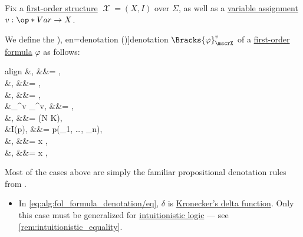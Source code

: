 \begin{algorithm}\label{alg:fol_formula_denotation}\mimprovised
  Fix a \hyperref[def:fol_structure]{first-order structure} \( \mscrX = (X, I) \) over \( \Sigma \), as well as a \hyperref[def:fol_variable_assignment]{variable assignment} \( v: \op*{Var} \to X \).

  We define the \term[ru=истинностное значение (формулы) (\cite[def. 2.2.10]{Герасимов2014Вычислимость}), en=denotation (\cite[91]{Hinman2005Logic})]{denotation} \( \Bracks{\varphi}_\mscrX^v \) of a \hyperref[def:fol_formula]{first-order formula} \( \varphi \) as follows:
  \begin{empheq}[left={\Bracks{\varphi}_\mscrX^v} \coloneqq \empheqlbrace]{align}
    &\semtop,                                                                         &&\varphi = \syntop,                   \label{eq:alg:fol_formula_denotation/top} \\
    &\sembot,                                                                         &&\varphi = \synbot,                   \label{eq:alg:fol_formula_denotation/bot} \\
    &,                                                  &&\varphi = \synneg \psi,              \label{eq:alg:fol_formula_denotation/neg} \\
    &\Bracks{\psi}_\mscrX^v \bincirc \Bracks{\theta}_\mscrX^v,                        &&\varphi = \psi \syncirc \theta,      \label{eq:alg:fol_formula_denotation/conn} \\
    &\delta{},                 &&\varphi = (N \syneq K),              \label{eq:alg:fol_formula_denotation/eq} \\
    &I(p), &&\varphi = p(\tau_1, \ldots, \tau_n), \label{eq:alg:fol_formula_denotation/pred} \\
    &\bigwedge{},   &&\varphi = \qforall x \psi,           \label{eq:alg:fol_formula_denotation/forall} \\
    &\bigvee{},     &&\varphi = \qexists x \psi,           \label{eq:alg:fol_formula_denotation/exists}
  \end{empheq}

  Most of the cases above are simply the familiar propositional denotation rules from .
  \begin{itemize}
    \item In \eqref{eq:alg:fol_formula_denotation/eq}, \( \delta \) is \hyperref[def:kronecker_delta]{Kronecker's delta function}. Only this case must be generalized for \hyperref[con:intuitionistic_logic]{intuitionistic logic} --- see \cref{rem:intuitionistic_equality}.


\end{itemize}
\end{algorithm}
